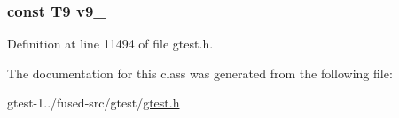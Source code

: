 \hypertarget{classtesting_1_1internal_1_1ValueArray25_a6356e16cf54a9dfac8525f20242af31e}{
\subsubsection[{v9\-\_\-}]{\setlength{\rightskip}{0pt plus 5cm}const \-T9 {\bf v9\-\_\-}}}\label{d2/de9/classtesting_1_1internal_1_1ValueArray25_a6356e16cf54a9dfac8525f20242af31e}


\-Definition at line 11494 of file gtest.\-h.



\-The documentation for this class was generated from the following file\-:\begin{DoxyCompactItemize}
\item 
gtest-\/1../fused-\/src/gtest/\hyperlink{fused-src_2gtest_2gtest_8h}{gtest.\-h}\end{DoxyCompactItemize}
